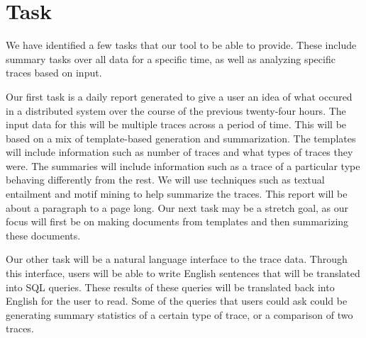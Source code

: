 \section{Task}

We have identified a few tasks that our tool to be able to provide. These include summary tasks over all data for a specific time,
as well as analyzing specific traces based on input. 

Our first task is a daily report generated to give a user an idea of what occured in a distributed system over the course 
of the previous twenty-four hours. The input data for this will be multiple traces across a period of time. This will be 
based on a mix of template-based generation and summarization. The templates will include information such as number of traces
and what types of traces they were. The summaries will include information such as a trace of a particular type behaving differently
from the rest. We will use techniques such as textual entailment and motif mining to help summarize the traces. This report
will be about a paragraph to a page long. Our next task may be a stretch goal, as our focus will first be on making documents from templates
and then summarizing these documents.

Our other task will be a natural language interface to the trace data. Through this interface, users will be able to write English sentences that will be
translated into SQL queries. These results of these queries will be translated back into English for the user to read. Some of the 
queries that users could ask could be generating summary statistics of a certain type of trace, or a comparison of two traces. 
